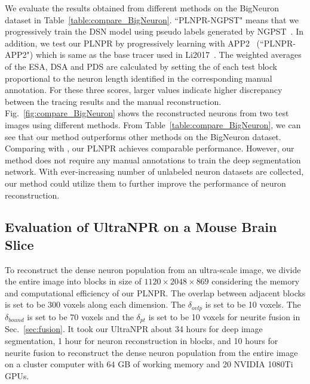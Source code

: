 We evaluate the results obtained from different methods on the BigNeuron dataset in Table~\ref{table:compare_BigNeuron}.
``PLNPR-NGPST" means that we progressively train the DSN model using pseudo labels generated by NGPST~\cite{Quan2015}. In addition, we test our PLNPR by progressively learning with APP2~\cite{Xiao2013} (``PLNPR-APP2") which is same as the base tracer used in Li2017~\cite{Li2017}.
%
The weighted averages of the ESA, DSA and PDS are calculated by setting the of each test block proportional to the neuron length identified in the corresponding manual annotation.
For these three scores, larger values indicate higher discrepancy between the tracing results and the manual reconstruction.
%
Fig.~\ref{fig:compare_BigNeuron} shows the reconstructed neurons from two test images using different methods.
%
From Table~\ref{table:compare_BigNeuron}, we can see that our method outperforms other methods on the BigNeuron dataset.
%
Comparing with \cite{Li2017}, our PLNPR achieves comparable performance.
%
However, our method does not require any manual annotations to train the deep segmentation network.
With ever-increasing number of unlabeled neuron datasets are collected, our method could utilize them to further improve the performance of neuron reconstruction.




\subsection{Evaluation of UltraNPR on a Mouse Brain Slice}
\label{sec:exp_UltraNPR}

To reconstruct the dense neuron population from an ultra-scale image, we divide the entire image into blocks in size of $1120\times 2048\times 869$ considering the memory and computational efficiency of our PLNPR.
%
The overlap between adjacent blocks is set to be $300$ voxels along each dimension. 
The $\delta_{ovlp}$ is set to be 10 voxels.
The $\delta_{bound}$ is set to be 70 voxels and the $\delta_{pt}$ is set to be 10 voxels for neurite fusion in Sec.~\ref{sec:fusion}.
%
It took our UltraNPR about 34 hours for deep image segmentation, 1 hour for neuron reconstruction in blocks, and 10 hours for neurite fusion to reconstruct the dense neuron population from the entire image on a cluster computer with $64$ GB of working memory and 20 NVIDIA 1080Ti GPUs.


